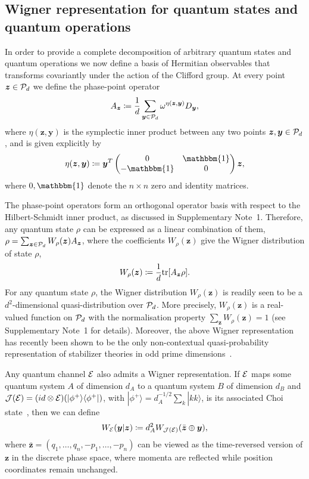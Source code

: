 \documentclass[
onecolumn,
superscriptaddress
]{revtex4-1}
\def\>{\rangle}
\def\<{\langle}
\def\id{\mathbbm{1}}
\renewcommand{\tr}{{\rm{tr}}}
\def\y{\boldsymbol{y}}
\def\z{\boldsymbol{z}}
\def\E{{\cal E}}
\def\J{{\cal J}}
\renewcommand{\P}{{\cal P}}
\begin{document}
\subsection*{Wigner representation for quantum states and quantum operations}

In order to provide a complete decomposition of arbitrary quantum states and quantum operations we now define a basis of Hermitian observables that transforms covariantly under the action of the Clifford group. At every point $\z \in \P_d$ we define the phase-point operator
\begin{equation}\label{eq:ax}
	A_{\z} \coloneqq \frac{1}{d} \sum_{\y \in \P_d} \omega^{\eta(\z, \y)} D_{\y}, 
\end{equation}
where $\eta(\z, \y)$ is the symplectic inner product between any two points $\z,\y \in \P_d$, and is given explicitly by
\begin{equation}
	\eta(\z, \y) \coloneqq \y^T \begin{pmatrix}
		0  & \id \\
		-\id & 0 \\
	\end{pmatrix} \z,
\end{equation}
where $0, \id$ denote the $n\times n$ zero and identity matrices.

The phase-point operators form an orthogonal operator basis with respect to the Hilbert-Schmidt inner product, as discussed in Supplementary Note~1.
Therefore, any quantum state $\rho$ can be expressed as a linear combination of them, $\rho = \sum_{\z \in \P_d} W_\rho(\z) A_{\z}$, where the coefficients $W_\rho(\z)$ give the Wigner distribution of state $\rho$,
\begin{equation}\label{eq:wstate}
    W_\rho(\z) \coloneqq \frac{1}{d}\tr[A_{\z} \rho].
\end{equation}
For any quantum state $\rho$, the Wigner distribution $W_\rho(\z)$ is readily seen to be a $d^2$-dimensional quasi-distribution over $\P_d$. More precisely, $W_\rho(\z)$ is a real-valued function on $\P_d$ with the normalisation property $\sum_{\z} W_\rho(\z) = 1$ (see Supplementary Note~1 for details). Moreover, the above Wigner representation has recently been shown to be the only non-contextual quasi-probability representation of stabilizer theories in odd prime dimensions~\cite{schmid2021noncontextual}.

Any quantum channel $\E$ also admits a Wigner representation. If $\E$ maps some quantum system $A$ of dimension $d_A$ to a quantum system $B$ of dimension $d_B$ and $\J(\E) = (id \otimes \E) (|\phi^+\> \<\phi^+|)$, with $|\phi^+\> = d_A^{-1/2} \sum_k |kk\>$, is its associated Choi state~\cite{watrous_2018}, then we can define
\begin{equation}\label{Wigner-Choi}
	W_{\E}(\y |\z) \coloneqq d_A^2 W_{\J(\E)}(\bar{\z} \oplus \y),
\end{equation}
where $\bar{\z} = (q_1, \dots, q_n, -p_1, \dots, -p_n)$ can be viewed as the time-reversed version of $\z$ in the discrete phase space, where momenta are reflected while position coordinates remain unchanged. 
\end{document}
